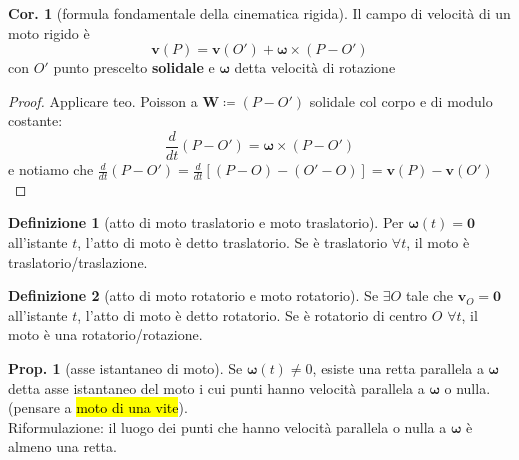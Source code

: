 \documentclass[a4paper,10pt]{article}
\theoremstyle{definition}
\newcommand{\bv}{\boldsymbol} %
\theoremstyle{indentdefinition}
\newtheorem{defn}{Definizione}[section]
\theoremstyle{indenttheorem}
\newtheorem{prop}{Prop.}
\newtheorem{cor}{Cor.}
\theoremstyle{myremark}
\theoremstyle{indentgeneral}
\newenvironment{myboxed} 
{\noindent\begin{lrbox}{\mybox}\begin{minipage}{\textwidth}}
{\end{minipage}\end{lrbox}\fbox{\usebox{\mybox}}}
\begin{document}
\begin{myboxed}
\begin{cor}[formula fondamentale della cinematica rigida]
Il campo di velocità di un moto rigido è $$\boldsymbol{v}\left(P\right)=\boldsymbol{v}\left(O'\right)+\boldsymbol{\omega}\times\left(P-O'\right)$$
con $O'$ punto prescelto \textbf{solidale} e $\boldsymbol{\omega}$ detta velocità di
rotazione
\end{cor}
\end{myboxed}
\begin{proof}
    Applicare teo. Poisson a $\bv{W}\coloneqq(P-O')$ solidale col corpo e di modulo costante: 
   $$\frac{d}{dt}(P-O')=\boldsymbol{\omega}\times\left(P-O'\right)$$
   e notiamo che $\frac{d}{dt}(P-O')=\frac{d}{dt}[(P-O)-(O'-O)]=\boldsymbol{v}\left(P\right)-\boldsymbol{v}\left(O'\right)$
    
\end{proof}

\begin{defn}[atto di moto traslatorio e moto traslatorio]
Per $\boldsymbol{\omega}\left(t\right)=\boldsymbol{0}$ all'istante
$t$, l'atto di moto è detto traslatorio. Se è traslatorio $\forall t$,
il moto è traslatorio/traslazione.
\end{defn}

\begin{defn}[atto di moto rotatorio e moto rotatorio]
Se $\exists O$ tale che $\boldsymbol{v}_{O}=\boldsymbol{0}$ all'istante
$t$, l'atto di moto è detto rotatorio. Se è rotatorio di centro $O$ $\forall t$,
il moto è una rotatorio/rotazione.
\end{defn}

\begin{prop}[asse istantaneo di moto]
\label{prop:asse-istantaneo-moto}Se $\boldsymbol{\omega}\left(t\right)\neq0$,
esiste una retta parallela a $\boldsymbol{\omega}$ detta asse istantaneo
del moto i cui punti hanno velocità parallela a $\boldsymbol{\omega}$
o nulla. (pensare a \hl{moto di una vite}). \\
Riformulazione: il luogo dei punti che hanno velocità parallela o nulla a $\bv{\omega}$ è almeno una retta.
\end{prop}
\end{document}
